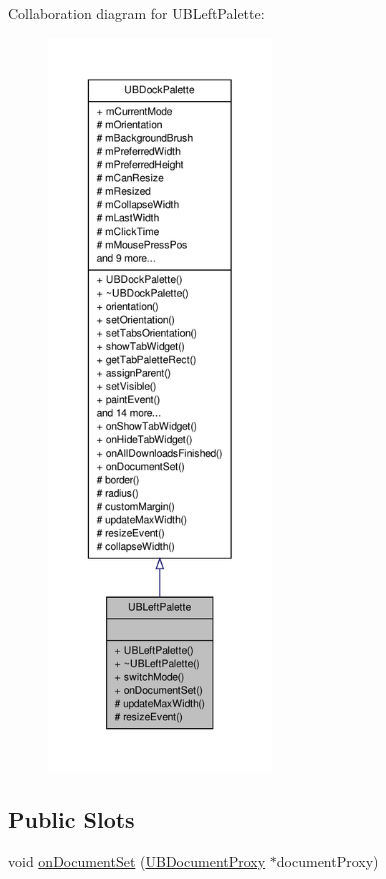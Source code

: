 Collaboration diagram for U\-B\-Left\-Palette\-:
\nopagebreak
\begin{figure}[H]
\begin{center}
\leavevmode
\includegraphics[height=550pt]{de/d36/class_u_b_left_palette__coll__graph}
\end{center}
\end{figure}
\subsection*{Public Slots}
\begin{DoxyCompactItemize}
\item 
void \hyperlink{class_u_b_left_palette_ad33222c25189b9ac471ebdb63159e607}{on\-Document\-Set} (\hyperlink{class_u_b_document_proxy}{U\-B\-Document\-Proxy} $\ast$document\-Proxy)
\end{DoxyCompactItemize}
